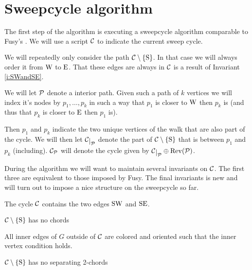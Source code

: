 
\section{Sweepcycle algorithm}
  \label{s:sweep}
  The first step of the algorithm is executing a sweepcycle algorithm comparable to Fusy's \cite{Fusy2006}. We will use a script $\C$ to indicate the current sweep cycle.

  We will repeatedly only consider the path $\cpath$. In that case we will always order it from $\pW$ to $\pE$. That these edges are always in $\C$ is a result of Invariant \ref{i:SWandSE}.

  We will let $\P$ denote a interior path. Given such a path of $k$ vertices we will index it's nodes by $p_1, \ldots, p_k$ in such a way that $p_1$ is closer to $\pW$ then $p_k$ is (and thus that $p_k$ is closer to $\pE$ then $p_1$ is).

  Then $p_1$ and $p_k$ indicate the two unique vertices of the walk that are also part of the cycle. We will then let $\restC{\P}$ denote the part of $\cpath$ that is between $p_1$ and $p_k$ (including). $\C_\P$ will denote the cycle given by $\restC{\P} \oplus \rev(\P)$.

  During the algorithm we will want to maintain several invariants on $\C$. The first three are equivalent to those imposed by Fusy. The final invariants is new and will turn out to impose a nice structure on the sweepcycle so far.

  \begin{invariants}
    \itemsep=-4pt

    \item \label{i:uni:SWandSE} The cycle $\C$ contains the two edges $\pS \pW$ and $\pS \pE$.
    \item \label{i:uni:noChords} $\cpath$ has no chords
    \item \label{i:uni:intVertCond} All inner edges of $G$ outside of $\C$ are colored and oriented such that the inner vertex condition holds. 
    \item \label{i:uni:no2Chords} $\C\sm{\pS}$ has no separating 2-chords
  \end{invariants}


